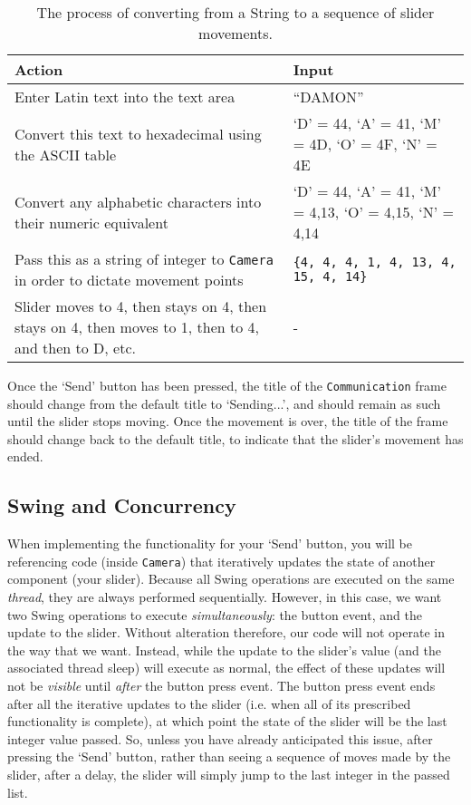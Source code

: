 \documentclass[11pt]{article}
\begin{document}
\begin{table}[h!]

	\begin{center}

		\begin{tabular}{p{8cm}p{6cm}}
			\hline
			Action & Input \\
			\hline
			Enter Latin text into the text area & ``DAMON'' \\
			\hline
			Convert this text to hexadecimal using the ASCII table & `D' = 44, `A' = 41, `M' = 4D, `O' = 4F, `N' = 4E \\
			\hline
			Convert any alphabetic characters into their numeric equivalent & `D' = 44, `A' = 41, `M' = 4,13, `O' = 4,15, `N' = 4,14 \\
			\hline
			Pass this as a string of integer to \texttt{Camera} in order to dictate movement points & \texttt{\{4, 4, 4, 1, 4, 13, 4, 15, 4, 14\}} \\
			\hline
			Slider moves to 4, then stays on 4, then stays on 4, then moves to 1, then to 4, and then to D, etc. & - \\
			\hline
		\end{tabular}
		
		\caption{The process of converting from a String to a sequence of slider movements.}
		\label{table:process}

	\end{center}

\end{table}%

Once the `Send' button has been pressed, the title of the \texttt{Communication} frame should change from the default title to `Sending...', and should remain as such until the slider stops moving. Once the movement is over, the title of the frame should change back to the default title, to indicate that the slider's movement has ended.

\subsection{Swing and Concurrency}

When implementing the functionality for your  `Send' button, you will be referencing code (inside \texttt{Camera}) that iteratively updates the state of another component (your slider). Because all Swing operations are executed on the same \emph{thread}, they are always performed sequentially. However, in this case, we want two Swing operations to execute \emph{simultaneously}: the button event, and the update to the slider. Without alteration therefore, our code will not operate in the way that we want. Instead, while the update to the slider's value (and the associated thread sleep) will execute as normal, the effect of these updates will not be \emph{visible} until \emph{after} the button press event. The button press event ends after all the iterative updates to the slider (i.e. when all of its prescribed functionality is complete), at which point the state of the slider will be the last integer value passed. So, unless you have already anticipated this issue, after pressing the `Send' button, rather than seeing a sequence of moves made by the slider, after a delay, the slider will simply jump to the last integer in the passed list.
\end{document}
